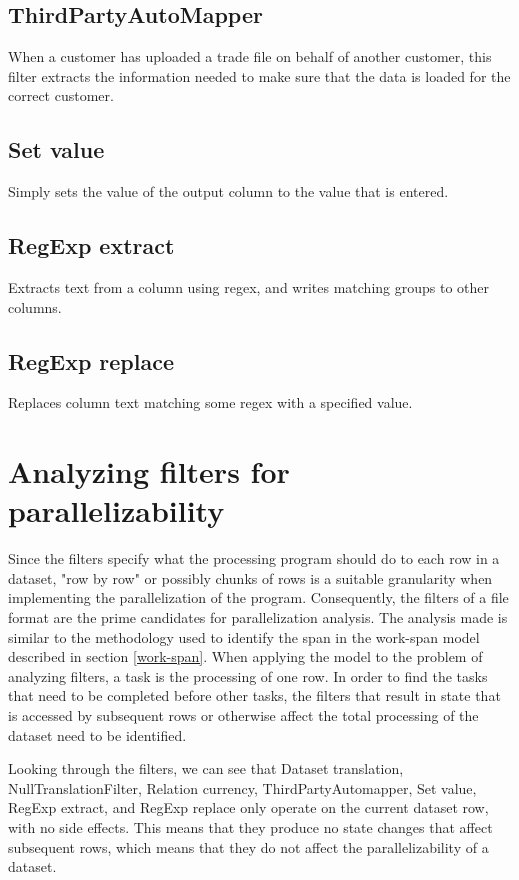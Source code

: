 \subsection{ThirdPartyAutoMapper}
When a customer has uploaded a trade file on behalf of another customer, this filter extracts the information needed to make sure that the data is loaded
for the correct customer.

\subsection{Set value}
Simply sets the value of the output column to the value that is entered.

\subsection{RegExp extract}
Extracts text from a column using regex, and writes matching groups to other columns.

\subsection{RegExp replace}
Replaces column text matching some regex with a specified value.

\section{Analyzing filters for parallelizability}
Since the filters specify what the processing program should do to each row in a dataset, "row by row" or possibly chunks of rows is a suitable
granularity when implementing the parallelization of the program. Consequently, the filters of a file format are the prime candidates
for parallelization analysis. The analysis made is similar to the methodology used to identify the span in the work-span model described in
section \ref{work-span}. When applying the model to the problem of analyzing filters, a task is the processing of one row. In order to find
the tasks that need to be completed before other tasks, the filters that result in state that is accessed by subsequent rows or otherwise
affect the total processing of the dataset need to be identified.

Looking through the filters, we can see that Dataset translation, NullTranslationFilter, Relation currency,
ThirdPartyAutomapper, Set value, RegExp extract, and RegExp replace only operate on the current dataset row, with no side effects.
This means that they produce no state changes that affect subsequent rows, which means that they do not affect the parallelizability of a dataset.

